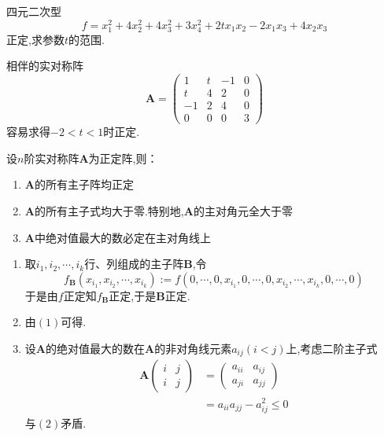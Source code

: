 \begin{brown}
    \begin{example}
        四元二次型\[
        f=x_1^2+4x_2^2+4x_3^2+3x_4^2+2tx_1x_2-2x_1x_3+4x_2x_3
        \]正定,求参数$t$的范围.
    \end{example}
    \begin{solution}
        相伴的实对称阵\[
        \bm{A}=\begin{pmatrix}
            1&t&-1&0\\
            t&4&2&0\\
            -1&2&4&0\\
            0&0&0&3  
        \end{pmatrix}
        \]容易求得$-2<t<1$时正定.
    \end{solution}
\end{brown}
\begin{green}
    \begin{corollary}[正定阵的性质]\label{cor:正定阵的性质}
        设$n$阶实对称阵$\bm{A}$为正定阵,则：\begin{enumerate}[label={\textup{(\arabic*)}}]
            \item $\bm{A}$的所有主子阵均正定
            
            \item $\bm{A}$的所有主子式均大于零.特别地,$\bm{A}$的主对角元全大于零
            \item $\bm{A}$中绝对值最大的数必定在主对角线上
        \end{enumerate}
    \end{corollary}
    \begin{Proof}
        \begin{enumerate}[label={\textup{(\arabic*)}}]
            \item 取$i_1,i_2,\cdots,i_k$行、列组成的主子阵$\bm{B}$,令\[
            f_{\bm{B}}\left(
                x_{i_1},x_{i_2},\cdots,x_{i_k}
            \right):=f\left(
                0,\cdots,0,x_{i_1},0,\cdots,0,x_{i_2},\cdots,x_{i_k},0,\cdots,0
            \right)
            \]于是由$f$正定知$f_{\bm{B}}$正定,于是$\bm{B}$正定.
            \item 由$(1)$可得.
            \item 设$\bm{A}$的绝对值最大的数在$\bm{A}$的非对角线元素$a_{ij}\left(i<j\right)$上,考虑二阶主子式\begin{align*}
                \bm{A}\begin{pmatrix}
                    i&j\\
                    i&j
                \end{pmatrix}&=\begin{pmatrix}
                    a_{ii}&a_{ij}\\
                    a_{ji}&a_{jj}
                \end{pmatrix}\\
                &=a_{ii}a_{jj}-a_{ij}^2\leqslant0
            \end{align*}与$(2)$矛盾.\qedhere
        \end{enumerate}
    \end{Proof}
\end{green}

